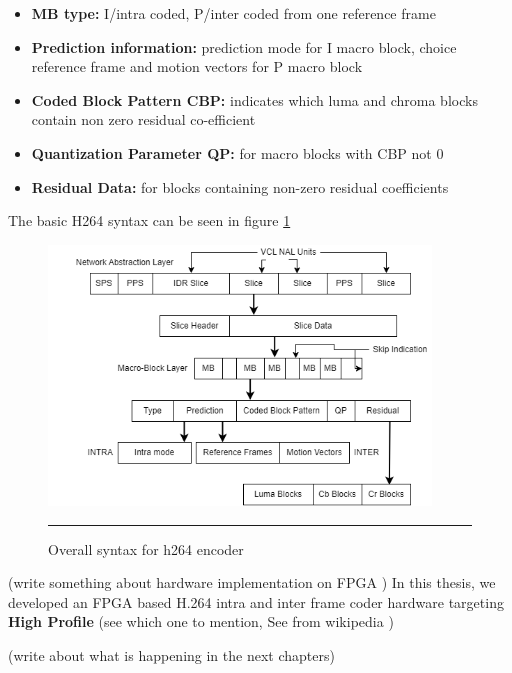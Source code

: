 \begin{itemize}
	\item \textbf{MB type:} I/intra coded, P/inter coded from one reference frame
	\item \textbf{Prediction information:} prediction mode for I macro block, choice reference frame and motion vectors for P macro block
	\item \textbf{Coded Block Pattern CBP:} indicates which luma and chroma blocks contain non zero residual co-efficient
	\item \textbf{Quantization Parameter QP:} for macro blocks with CBP not 0
	\item \textbf{Residual Data:} for blocks containing non-zero residual coefficients
\end{itemize}

The basic H264 syntax can be seen in figure \ref{fig:syntax}
\begin{figure}[htbp]
	\centering
	\includegraphics[width = 4in]{./Figures/syntax.png}
	\rule{35em}{0.5pt}
	\caption{Overall syntax for h264 encoder}
	\label{fig:syntax}
\end{figure}

(write something about hardware implementation on FPGA )
In this thesis, we developed an FPGA based H.264 intra and inter frame coder hardware targeting \textbf{High Profile} (see which one to mention, See from wikipedia )

(write about what is happening in the next chapters)
